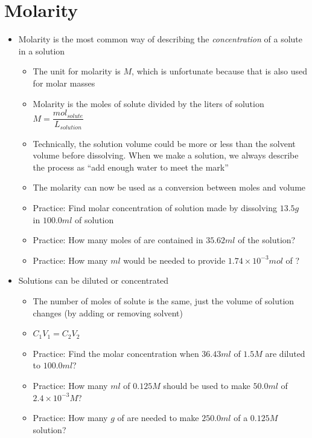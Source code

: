\documentclass[12pt, openany, letterpaper]{memoir}
\begin{document}
\section{Molarity}
\begin{itemize}
  \item Molarity is the most common way of describing the \emph{concentration} of a solute in a solution
  \begin{itemize}
    \item The unit for molarity is $M$, which is unfortunate because that is also used for molar masses
    \item Molarity is the moles of solute divided by the liters of solution $M=\dfrac{mol_{solute}}{L_{solution}}$
    \item Technically, the solution volume could be more or less than the solvent volume before dissolving. When we make a solution, we always describe the process as ``add enough water to meet the mark''
    \item The molarity can now be used as a conversion between moles and volume
    \item Practice: Find molar concentration of solution made by dissolving $13.5g$  in $100.0ml$ of solution
    \item Practice: How many moles of  are contained in $35.62ml$ of the solution?
    \item Practice: How many $ml$ would be needed to provide $1.74\times10^{-3}mol$ of ?
  \end{itemize}
  \item Solutions can be diluted or concentrated
  \begin{itemize}
    \item The number of moles of solute is the same, just the volume of solution changes (by adding or removing solvent)
    \item $C_1V_1=C_2V_2$
    \item Practice: Find the molar concentration when $36.43ml$ of $1.5M$  are diluted to $100.0ml$?
    \item Practice: How many $ml$ of $0.125M$  should be used to make $50.0ml$ of $2.4\times10^{-3}M$?
    \item Practice: How many $g$ of  are needed to make $250.0ml$ of a $0.125M$ solution?
  \end{itemize}
\end{itemize}
\end{document}

